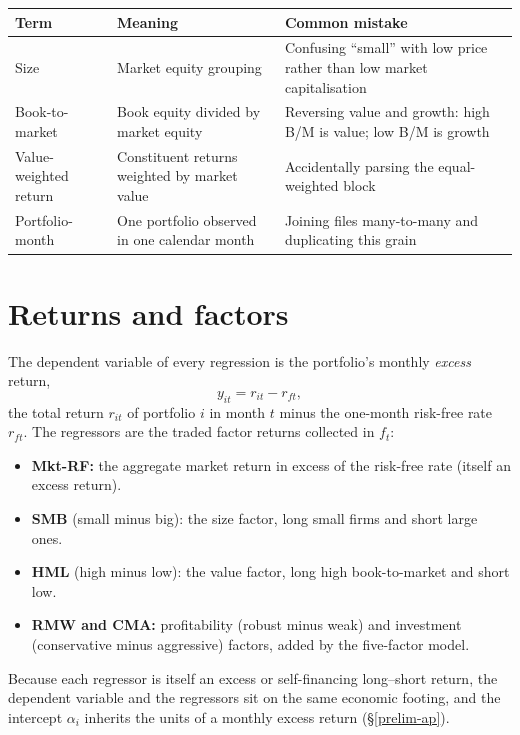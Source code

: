 \begin{longtable}[]{@{}p{}p{}p{}@{}}
\toprule\noalign{}
Term & Meaning & Common mistake \\
\midrule\noalign{}
\endhead
\bottomrule\noalign{}
\endlastfoot
Size & Market equity grouping & Confusing ``small'' with low price
rather than low market capitalisation \\
Book-to-market & Book equity divided by market equity & Reversing value
and growth: high B/M is value; low B/M is growth \\
Value-weighted return & Constituent returns weighted by market value &
Accidentally parsing the equal-weighted block \\
Portfolio-month & One portfolio observed in one calendar month & Joining
files many-to-many and duplicating this grain \\
\end{longtable}

\hypertarget{returns-and-factors}{%
\section{Returns and factors}\label{returns-and-factors}}

The dependent variable of every regression is the portfolio's monthly
\emph{excess} return,
\begin{equation}
y_{it} = r_{it} - r_{ft},
\end{equation}
the total return $r_{it}$ of portfolio $i$ in month $t$ minus the
one-month risk-free rate $r_{ft}$. The regressors are the traded factor
returns collected in $f_t$:
\begin{itemize}
\tightlist
\item
  \textbf{Mkt-RF:} the aggregate market return in excess of the risk-free
  rate (itself an excess return).
\item
  \textbf{SMB} (small minus big): the size factor, long small firms and
  short large ones.
\item
  \textbf{HML} (high minus low): the value factor, long high
  book-to-market and short low.
\item
  \textbf{RMW and CMA:} profitability (robust minus weak) and investment
  (conservative minus aggressive) factors, added by the five-factor model.
\end{itemize}

Because each regressor is itself an excess or self-financing long--short
return, the dependent variable and the regressors sit on the same
economic footing, and the intercept $\alpha_i$ inherits the units of a
monthly excess return (\S\ref{prelim-ap}).

